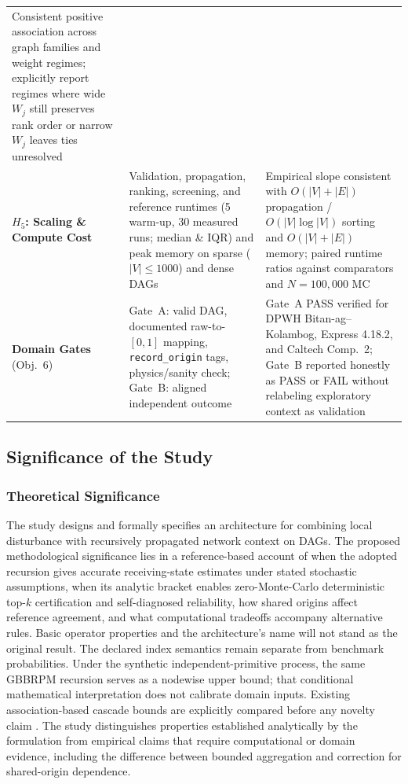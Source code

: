 \begin{table}[htbp]
\begin{tabularx}{\textwidth}{@{}>{\raggedright\arraybackslash}p{2.65cm} L L@{}}
Consistent positive association across graph families and weight regimes; explicitly report regimes where wide $W_j$ still preserves rank order or narrow $W_j$ leaves ties unresolved \\
\addlinespace
\textbf{$H_5$: Scaling \& Compute Cost} &
Validation, propagation, ranking, screening, and reference runtimes (5 warm-up, 30 measured runs; median \& IQR) and peak memory on sparse ($|V|\le 1000$) and dense DAGs &
Empirical slope consistent with $O(|V|+|E|)$ propagation / $O(|V|\log|V|)$ sorting and $O(|V|+|E|)$ memory; paired runtime ratios against comparators and $N=100{,}000$ MC \\
\addlinespace
\textbf{Domain Gates} \newline (Obj.~6) &
Gate~A: valid DAG, documented raw-to-$[0,1]$ mapping, \texttt{record\_origin} tags, physics/sanity check; Gate~B: aligned independent outcome &
Gate~A PASS verified for DPWH Bitan-ag--Kolambog, Express 4.18.2, and Caltech Comp.~2; Gate~B reported honestly as PASS or FAIL without relabeling exploratory context as validation \\
\bottomrule
\end{tabularx}
\end{table}

\subsection{Significance of the Study}\label{significance-of-the-study}

\subsubsection{Theoretical Significance}

The study designs and formally specifies an architecture for combining
local disturbance with recursively propagated network context on DAGs.
The proposed methodological significance lies in a reference-based
account of when the adopted recursion gives accurate receiving-state estimates
under stated stochastic assumptions, when its analytic bracket enables
zero-Monte-Carlo deterministic top-$k$ certification and self-diagnosed
reliability, how shared origins affect reference agreement, and what
computational tradeoffs accompany alternative rules. Basic operator
properties and the architecture's name will not stand as the original result.
The declared index semantics remain separate from benchmark probabilities.
Under the synthetic independent-primitive process, the same GBBRPM recursion
serves as a nodewise upper bound; that conditional mathematical interpretation
does not calibrate domain inputs. Existing association-based cascade bounds
are explicitly compared before any novelty claim \citep{abbe2017,abbe2020}.
The study distinguishes properties established analytically by the formulation
from empirical claims that require computational or domain evidence, including
the difference between bounded aggregation and correction for shared-origin
dependence.

